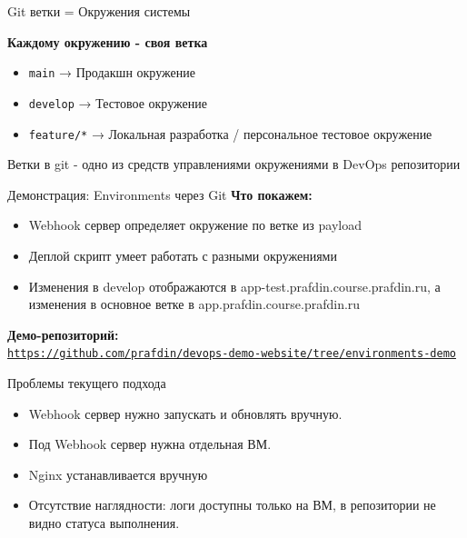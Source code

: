 \documentclass[aspectratio=169]{beamer}
\begin{document}
    \begin{frame}{Git ветки = Окружения системы}
        \begin{center}
            \large
            \textbf{Каждому окружению - своя ветка}
        \end{center}
        
        \vspace{0.5cm}
        
        \begin{itemize}
            \item \texttt{main} → Продакшн окружение
            \item \texttt{develop} → Тестовое окружение
            \item \texttt{feature/*} → Локальная разработка / персональное тестовое окружение
        \end{itemize}
        
        \vspace{0.2cm}

        Ветки в git - одно из средств управлениями окружениями в DevOps репозитории
    \end{frame}

    \begin{frame}{Демонстрация: Environments через Git}
        \textbf{Что покажем:}
        \begin{itemize}
            \item Webhook сервер определяет окружение по ветке из payload
            \item Деплой скрипт умеет работать с разными окружениями
            \item Изменения в develop отображаются в app-test.prafdin.course.prafdin.ru, а изменения в основное ветке в app.prafdin.course.prafdin.ru
        \end{itemize}
        
        \vspace{0.2cm}
        \textbf{Демо-репозиторий:} \\
        \href{https://github.com/prafdin/devops-demo-website/tree/environments-demo}{\texttt{https://github.com/prafdin/devops-demo-website/tree/environments-demo}}
    \end{frame}

    \begin{frame}{Проблемы текущего подхода}
        \begin{itemize}
            \item Webhook сервер нужно запускать и обновлять вручную.
            \item Под Webhook сервер нужна отдельная ВМ.
            \item Nginx устанавливается вручную
            \item Отсутствие наглядности: логи доступны только на ВМ, в репозитории не видно статуса выполнения.
        \end{itemize}
    \end{frame}
\end{document}
